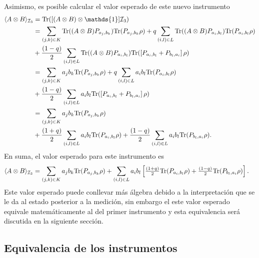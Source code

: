 Asimismo, es posible calcular el valor esperado de este nuevo instrumento \begin{equation*}
    \begin{split}
        \la A\otimes B \ra_{\mathcal{I}_3}&=\tr([(A\otimes B) \otimes \mathds{1}]\mathcal{I}_3)\\
        &=\sum_{(j,k)\in K} \tr((A\otimes B )P_{a_j,b_k})\tr(P_{a_j,b_k}\rho)+q\sum_{(i,l)\in L}\tr((A\otimes B)P_{a_i,b_l}) \tr(P_{a_i,b_l}\rho)\\
        &+\dfrac{(1-q)}{2}\sum_{(i,l) \in L}\tr((A\otimes B )P_{a_i,b_l}) \tr(\left[P_{a_i,b_l}+P_{b_l,a_i}\right]\rho)\\
        &=\sum_{(j,k)\in K} a_j b_k\tr(P_{a_j,b_k}\rho)+q\sum_{(i,l)\in L}a_i b_l \tr(P_{a_i,b_l}\rho)\\
        &+\dfrac{(1-q)}{2}\sum_{(i,l) \in L} a_i b_l\tr(\left[P_{a_i,b_l}+P_{b_l,a_i}\right]\rho)\\
        &=\sum_{(j,k)\in K} a_j b_k \tr(P_{a_j, b_k}\rho)\\
        &+\dfrac{(1+q)}{2}\sum_{(i,l)\in L}a_i b_l \tr(P_{a_i,b_l}\rho) +\dfrac{(1-q)}{2}\sum_{(i,l) \in L}a_i b_l \tr(P_{b_l, a_i}\rho).
    \end{split}
\end{equation*}En suma, el valor esperado para este instrumento es \begin{equation}\label{eq:expectedValueThirdInstrument2p}
    \begin{split}
        \langle A\otimes B \rangle_{\mathcal{I}_3}&=\sum_{(j,k)\in K} a_j b_k {\rm Tr}(P_{a_j, b_k}\rho)+\sum_{(i,l)\in L}a_i b_l \left[\tfrac{(1+q)}{2} {\rm Tr}(P_{a_i,b_l}\rho) +\tfrac{(1-q)}{2}{\rm Tr}(P_{b_l, a_i}\rho)\right].
    \end{split}
\end{equation} Este valor esperado puede conllevar más álgebra debido a la interpretación que se le da al estado posterior a la medición, sin embargo el  este valor esperado equivale matemáticamente al del primer instrumento y esta equivalencia será discutida en la siguiente sección. 






\subsection{Equivalencia de los instrumentos}\label{subsec:Equivalencia } %



